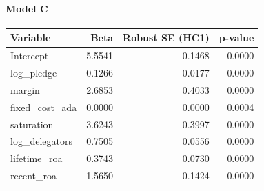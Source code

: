 \documentclass[11pt]{article}
\begin{document}
\paragraph{Model C}
\begin{table}[h]
\centering
\small
\begin{tabular}{lrrr}
\toprule
Variable & Beta & Robust SE (HC1) & p-value \\
\midrule
Intercept & 5.5541 & 0.1468 & 0.0000 \\
log\_pledge & 0.1266 & 0.0177 & 0.0000 \\
margin & 2.6853 & 0.4033 & 0.0000 \\
fixed\_cost\_ada & 0.0000 & 0.0000 & 0.0004 \\
saturation & 3.6243 & 0.3997 & 0.0000 \\
log\_delegators & 0.7505 & 0.0556 & 0.0000 \\
lifetime\_roa & 0.3743 & 0.0730 & 0.0000 \\
recent\_roa & 1.5650 & 0.1424 & 0.0000 \\
\bottomrule
\end{tabular}
\end{table}

\end{document}
